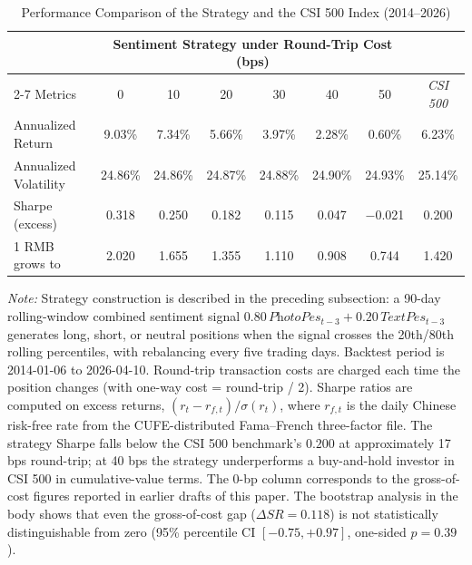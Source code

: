 \documentclass[AER]{AEA}
\begin{document}
\begin{table}[h!]
\centering
\caption{Performance Comparison of the Strategy and the CSI 500 Index (2014--2026)}
\label{tab:performance_comparison}
    \setlength{\tabcolsep}{4pt}
    \small
\begin{tabular}{lccccccc}
\toprule
& \multicolumn{6}{c}{Sentiment Strategy under Round-Trip Cost (bps)} & \\
\cmidrule(lr){2-7}
Metrics & 0 & 10 & 20 & 30 & 40 & 50 & \textit{CSI 500} \\
\midrule
Annualized Return     & 9.03\%   & 7.34\%   & 5.66\%   & 3.97\%   & 2.28\%   & 0.60\%   & 6.23\% \\
Annualized Volatility & 24.86\%  & 24.86\%  & 24.87\%  & 24.88\%  & 24.90\%  & 24.93\%  & 25.14\% \\
Sharpe (excess)       & 0.318    & 0.250    & 0.182    & 0.115    & 0.047    & $-$0.021 & 0.200 \\
1 RMB grows to        & 2.020    & 1.655    & 1.355    & 1.110    & 0.908    & 0.744    & 1.420 \\
\bottomrule
\end{tabular}

\vspace{0.2cm}
\footnotesize
\textit{Note:} Strategy construction is described in the preceding subsection: a 90-day rolling-window combined sentiment signal $0.80\,\textit{PhotoPes}_{t-3}+0.20\,\textit{TextPes}_{t-3}$ generates long, short, or neutral positions when the signal crosses the 20th/80th rolling percentiles, with rebalancing every five trading days. Backtest period is 2014-01-06 to 2026-04-10. Round-trip transaction costs are charged each time the position changes (with one-way cost = round-trip / 2). Sharpe ratios are computed on excess returns, $(r_t - r_{f,t})/\sigma(r_t)$, where $r_{f,t}$ is the daily Chinese risk-free rate from the CUFE-distributed Fama--French three-factor file. The strategy Sharpe falls below the CSI 500 benchmark's $0.200$ at approximately 17 bps round-trip; at 40 bps the strategy underperforms a buy-and-hold investor in CSI 500 in cumulative-value terms. The 0-bp column corresponds to the gross-of-cost figures reported in earlier drafts of this paper. The bootstrap analysis in the body shows that even the gross-of-cost gap ($\Delta SR = 0.118$) is not statistically distinguishable from zero (95\% percentile CI $[-0.75, +0.97]$, one-sided $p = 0.39$).
\end{table}
\end{document}
